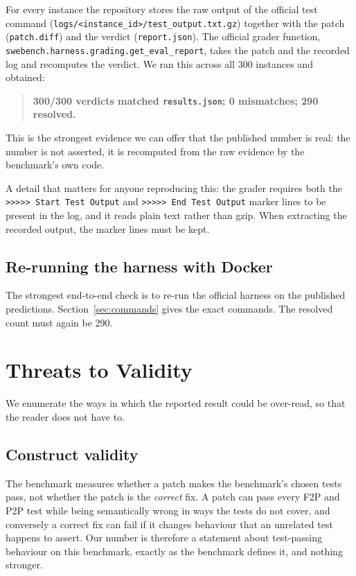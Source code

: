 \documentclass[11pt,a4paper]{article}
\begin{document}
For every instance the repository stores the raw output of the official test command
(\texttt{logs/<instance\_id>/test\_output.txt.gz}) together with the patch
(\texttt{patch.diff}) and the verdict (\texttt{report.json}). The official grader
function, \texttt{swebench.harness.grading.get\_eval\_report}, takes the patch and the
recorded log and recomputes the verdict. We ran this across all 300 instances and
obtained:

\begin{quote}
\textbf{300/300 verdicts matched \texttt{results.json}; 0 mismatches; 290 resolved.}
\end{quote}

This is the strongest evidence we can offer that the published number is real: the number
is not asserted, it is recomputed from the raw evidence by the benchmark's own code.

A detail that matters for anyone reproducing this: the grader requires both the
\texttt{>>>>> Start Test Output} and \texttt{>>>>> End Test Output} marker lines to be
present in the log, and it reads plain text rather than gzip. When extracting the
recorded output, the marker lines must be kept.

\subsection{Re-running the harness with Docker}

The strongest end-to-end check is to re-run the official harness on the published
predictions. Section~\ref{sec:commands} gives the exact commands. The resolved count must
again be 290.

\section{Threats to Validity}
\label{sec:threats}

We enumerate the ways in which the reported result could be over-read, so that the
reader does not have to.

\subsection{Construct validity}

The benchmark measures whether a patch makes the benchmark's chosen tests pass, not
whether the patch is the \emph{correct} fix. A patch can pass every F2P and P2P test
while being semantically wrong in ways the tests do not cover, and conversely a correct
fix can fail if it changes behaviour that an unrelated test happens to assert. Our
number is therefore a statement about test-passing behaviour on this benchmark, exactly
as the benchmark defines it, and nothing stronger.
\end{document}
